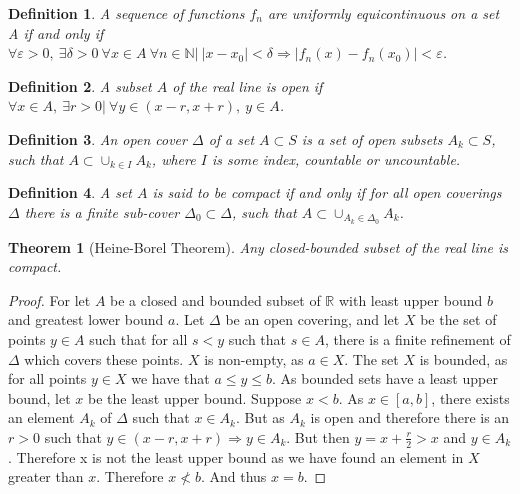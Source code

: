 \documentclass[oneside]{book}
\theoremstyle{mystyle}
\newtheorem{theorem}{Theorem}[section]
\newtheorem{definition}{Definition}[section]
\begin{document}
\begin{definition} A sequence of functions $f_n$ are uniformly equicontinuous on a set A if and only if $\forall\varepsilon>0,\ \exists \delta>0\ \forall x\in A\ \forall n\in\mathbb{N}|\ |x-x_0|<\delta \Rightarrow |f_n(x) - f_n(x_0)|<\varepsilon$.
\end{definition}

\begin{definition} A subset $A$ of the real line is open if $\forall x\in A,\ \exists r>0|\ \forall y \in (x-r,x+r),\ y\in A$.
\end{definition}

\begin{definition}
An open cover $\Delta$ of a set $A\subset S$ is a set of open subsets $A_k\subset S$, such that $A \subset \cup_{k\in I} A_k$, where $I$ is some index, countable or uncountable.
\end{definition}

\begin{definition}
A set $A$ is said to be compact if and only if for all open coverings $\Delta$ there is a finite sub-cover $\Delta_0\subset \Delta$, such that $A\subset \cup_{A_k \in \Delta_0} A_k$.
\end{definition}

\begin{theorem}[Heine-Borel Theorem]
Any closed-bounded subset of the real line is compact. 
\end{theorem}
\begin{proof}
For let $A$ be a closed and bounded subset of $\mathbb{R}$ with least upper bound $b$ and greatest lower bound $a$. Let $\Delta$ be an open covering, and let $X$ be the set of points $y\in A$ such that for all $s<y$ such that $s\in A$, there is a finite refinement of $\Delta$ which covers these points. $X$ is non-empty, as $a\in X$. The set $X$ is bounded, as for all points $y\in X$ we have that $a\leq y \leq b$. As bounded sets have a least upper bound, let $x$ be the least upper bound. Suppose $x<b$. As $x\in [a,b]$, there exists an element $A_k$ of $\Delta$ such that $x \in A_k$. But as $A_k$ is open and therefore there is an $r>0$ such that $y\in (x-r,x+r)\Rightarrow y \in A_k$. But then $y=x + \frac{r}{2} > x$ and $y\in A_k$. Therefore x is not the least upper bound as we have found an element in $X$ greater than $x$. Therefore $x\not<b$. And thus $x=b$.
\end{proof}
\end{document}
